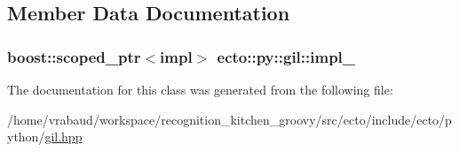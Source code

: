 \subsection{\-Member \-Data \-Documentation}
\hypertarget{classecto_1_1py_1_1gil_af91dedbf0eb88a914bacb64ff176bf93}{
\subsubsection[{impl\-\_\-}]{\setlength{\rightskip}{0pt plus 5cm}boost\-::scoped\-\_\-ptr$<$impl$>$ {\bf ecto\-::py\-::gil\-::impl\-\_\-}}}\label{classecto_1_1py_1_1gil_af91dedbf0eb88a914bacb64ff176bf93}


\-The documentation for this class was generated from the following file\-:\begin{DoxyCompactItemize}
\item 
/home/vrabaud/workspace/recognition\-\_\-kitchen\-\_\-groovy/src/ecto/include/ecto/python/\hyperlink{gil_8hpp}{gil.\-hpp}\end{DoxyCompactItemize}
